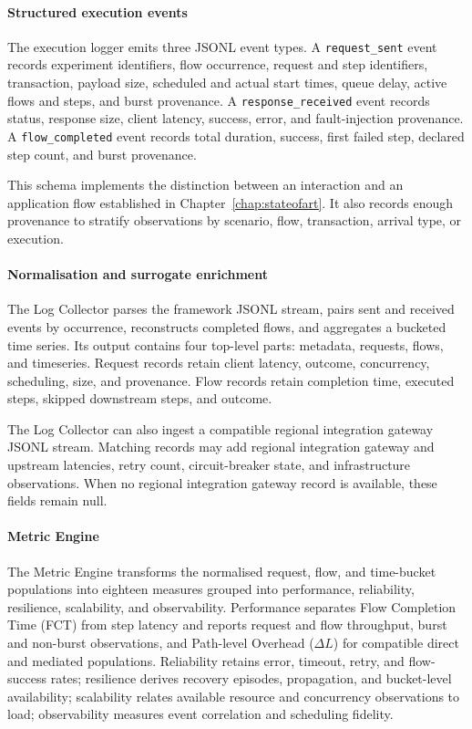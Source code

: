 \paragraph{Structured execution events}
\noindent The execution logger emits three JSONL event types. A
\texttt{request\_sent} event records experiment identifiers, flow occurrence,
request and step identifiers, transaction, payload size, scheduled and actual
start times, queue delay, active flows and steps, and burst provenance. A
\texttt{response\_received} event records status, response size, client
latency, success, error, and fault-injection provenance. A
\texttt{flow\_completed} event records total duration, success, first failed
step, declared step count, and burst provenance.

\noindent This schema implements the distinction between an interaction and an
application flow established in Chapter~\ref{chap:stateofart}. It also
records enough provenance to stratify observations by scenario, flow,
transaction, arrival type, or execution.

\paragraph{Normalisation and surrogate enrichment}
\noindent The Log Collector parses the framework JSONL stream, pairs sent and received events
by occurrence, reconstructs completed flows, and aggregates a bucketed time
series. Its output contains four top-level parts: metadata, requests, flows, and
timeseries. Request records retain client latency, outcome, concurrency,
scheduling, size, and provenance. Flow records retain completion time, executed
steps, skipped downstream steps, and outcome.

\noindent The Log Collector can also ingest a compatible
regional integration gateway JSONL stream. Matching records may add regional
integration gateway and
upstream latencies, retry count, circuit-breaker state, and infrastructure
observations. When no regional integration gateway record is
available, these fields remain null.

\paragraph{Metric Engine}
\noindent The Metric Engine transforms the normalised request, flow, and
time-bucket populations into eighteen measures grouped into performance,
reliability, resilience, scalability, and observability. Performance separates
Flow Completion Time (FCT) from step latency and reports request and flow
throughput, burst and non-burst observations, and Path-level Overhead ($\Delta L$) for compatible
direct and mediated populations. Reliability retains error, timeout, retry, and
flow-success rates; resilience derives recovery episodes, propagation, and
bucket-level availability; scalability relates available resource and
concurrency observations to load; observability measures event correlation and
scheduling fidelity.

